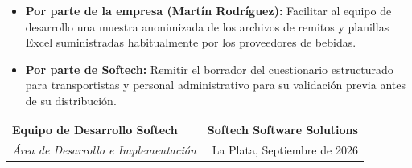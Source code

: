 \documentclass[11pt,a4paper]{article}
\begin{document}
\begin{itemize}
  \item \textbf{Por parte de la empresa (Martín Rodríguez):} Facilitar al equipo de desarrollo una muestra anonimizada de los archivos de remitos y planillas Excel suministradas habitualmente por los proveedores de bebidas.
  \item \textbf{Por parte de Softech:} Remitir el borrador del cuestionario estructurado para transportistas y personal administrativo para su validación previa antes de su distribución.
\end{itemize}

\vspace{10pt}

\noindent
{}

\vfill

\noindent
\begin{tabularx}{\textwidth}{@{}X r@{}}
  \textbf{Equipo de Desarrollo Softech} & \textbf{Softech Software Solutions} \\
  \textit{Área de Desarrollo e Implementación} & La Plata, Septiembre de 2026 \\
\end{tabularx}
\end{document}
